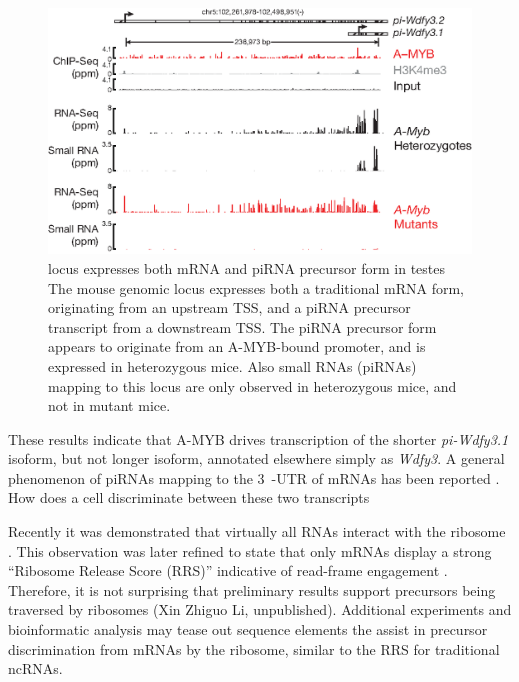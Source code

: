     \begin{figure} %
      \centering 
      \includegraphics{Figures/Discussion/pi-wdfy3.eps}
      \caption[\wdfy{} locus expresses both mRNA and piRNA precursor form in testes]
      {\wdfy{} locus expresses both mRNA and piRNA precursor form in testes\\[0.25cm]
        The mouse genomic locus \wdfy{} expresses both a traditional mRNA form, originating from an upstream TSS, and a piRNA precursor transcript from a downstream TSS. The piRNA precursor form appears to originate from an A-MYB-bound promoter, and is expressed in \amyb{} heterozygous mice. Also small RNAs (piRNAs) mapping to this locus are only observed in \amyb{} heterozygous mice, and not in \amyb{} mutant mice.
        }
      \label{Disc:fig:wdfy3}
      \end{figure}

    These results indicate that A-MYB drives transcription of the shorter \textit{pi-Wdfy3.1} isoform, but not longer isoform, annotated elsewhere simply as \textit{Wdfy3}. A general phenomenon of piRNAs mapping to the 3\textprime~-UTR of mRNAs has been reported \citep{Robine2009}. How does a cell discriminate between these two transcripts

    Recently it was demonstrated that virtually all RNAs interact with the ribosome \citep{Ingolia2011}. This observation was later refined to state that only mRNAs display a strong ``Ribosome Release Score (RRS)'' indicative of read-frame engagement \citep{Guttman2013}. Therefore, it is not surprising that preliminary results support precursors being traversed by ribosomes (Xin Zhiguo Li, unpublished). Additional experiments and bioinformatic analysis may tease out sequence elements the assist in precursor discrimination from mRNAs by the ribosome, similar to the RRS for traditional ncRNAs.

